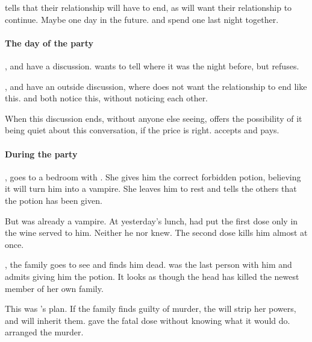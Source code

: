  tells  that their relationship will have to end, as  will want their relationship to continue. Maybe one day in the future.  and  spend one last night together.

\paragraph{The day of the party}

,  and  have a discussion.  wants  to tell where it was the night before, but  refuses.

,  and  have an outside discussion, where  does not want the relationship to end like this.  and  both notice this, without noticing each other.

When this discussion ends, without anyone else seeing,  offers  the possibility of it being quiet about this conversation, if the price is right.  accepts and pays.

\paragraph{During the party}

,  goes to a bedroom with . She gives him the correct forbidden potion, believing it will turn him into a vampire. She leaves him to rest and tells the others that the potion has been given.

But  was already a vampire. At yesterday's lunch,  had put the first dose only in the wine served to him. Neither he nor  knew. The second dose kills him almost at once.

, the family goes to see  and finds him dead.  was the last person with him and admits giving him the potion. It looks as though the head has killed the newest member of her own family.

This was 's plan. If the family finds  guilty of murder, the  will strip her powers, and  will inherit them.  gave the fatal dose without knowing what it would do.  arranged the murder.

